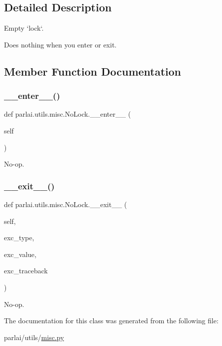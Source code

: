 \subsection{Detailed Description}
\begin{DoxyVerb}Empty `lock`.

Does nothing when you enter or exit.
\end{DoxyVerb}
 

\subsection{Member Function Documentation}
\mbox{\label{classparlai_1_1utils_1_1misc_1_1NoLock_a8b86612989f12c74a104aedfb85d41ef}} 
\subsubsection{\texorpdfstring{\+\_\+\+\_\+enter\+\_\+\+\_\+()}{\_\_enter\_\_()}}
{\footnotesize\ttfamily def parlai.\+utils.\+misc.\+No\+Lock.\+\_\+\+\_\+enter\+\_\+\+\_\+ (\begin{DoxyParamCaption}\item[{}]{self }\end{DoxyParamCaption})}

\begin{DoxyVerb}No-op.
\end{DoxyVerb}
 \mbox{\label{classparlai_1_1utils_1_1misc_1_1NoLock_a4f7170fad1283a391068f0b403734502}} 
\subsubsection{\texorpdfstring{\+\_\+\+\_\+exit\+\_\+\+\_\+()}{\_\_exit\_\_()}}
{\footnotesize\ttfamily def parlai.\+utils.\+misc.\+No\+Lock.\+\_\+\+\_\+exit\+\_\+\+\_\+ (\begin{DoxyParamCaption}\item[{}]{self,  }\item[{}]{exc\+\_\+type,  }\item[{}]{exc\+\_\+value,  }\item[{}]{exc\+\_\+traceback }\end{DoxyParamCaption})}

\begin{DoxyVerb}No-op.
\end{DoxyVerb}
 

The documentation for this class was generated from the following file\+:\begin{DoxyCompactItemize}
\item 
parlai/utils/\hyperlink{misc_8py}{misc.\+py}\end{DoxyCompactItemize}
